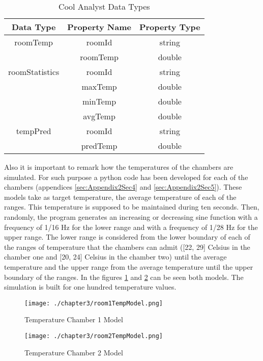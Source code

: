\begin{table}[h!]
\centering
	\begin{tabular}{||c|c|c||} 
	\hline\hline
	Data Type & Property Name & Property Type \\ [1ex] 
	\hline\hline
	roomTemp & roomId & string  \\
	& roomTemp & double  \\
	\hline
	roomStatistics & roomId & string  \\
	& maxTemp & double \\
	& minTemp & double  \\
	& avgTemp & double \\
	\hline
	tempPred & roomId & string  \\
	& predTemp & double \\
	\hline\hline
	\end{tabular}
\caption{Cool Analyst Data Types}
\label{Cool Analyst Data Types}
\end{table}

Also it is important to remark how the temperatures of the chambers are simulated. For such purpose a python code has been developed for each of the chambers (appendices \ref{sec:Appendix2Sec4} and \ref{sec:Appendix2Sec5}). These models take as target temperature, the average temperature of each of the ranges. This temperature is supposed to be maintained during ten seconds. Then, randomly, the program generates an increasing or decreasing sine function with a frequency of 1/16 Hz for the lower range and with a frequency of 1/28 Hz for the upper range. The lower range is considered from the lower boundary of each of the ranges of temperature that the chambers can admit ([22, 29] Celsius in the chamber one and [20, 24] Celsius in the chamber two) until the average temperature and the upper range from the average temperature until the upper boundary of the ranges. In the figures \ref{fig:Temperature Chamber 1 Model} and \ref{fig:Temperature Chamber 2 Model} can be seen both models. The simulation is built for one hundred temperature values.

\begin{figure}
\centering
{\texttt{[image: ./chapter3/room1TempModel.png]}}
\caption{Temperature Chamber 1 Model}
\label{fig:Temperature Chamber 1 Model}
\end{figure}

\begin{figure}
\centering
{\texttt{[image: ./chapter3/room2TempModel.png]}}
\caption{Temperature Chamber 2 Model}
\label{fig:Temperature Chamber 2 Model}
\end{figure}

